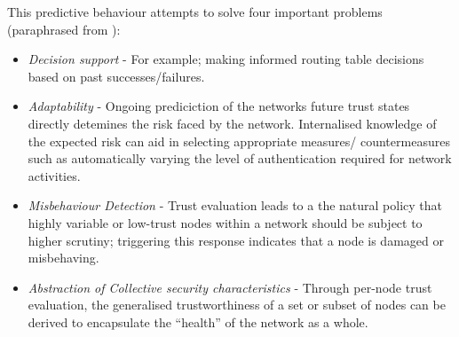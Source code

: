 This predictive behaviour attempts to solve four important problems (paraphrased from \cite{Sun2008}):
\begin{itemize}
  \item \emph{Decision support} - For example; making informed routing table decisions based on past successes/failures.
  \item \emph{Adaptability} - Ongoing prediciction of the networks future trust states directly detemines the risk faced by the network. Internalised knowledge of the expected risk can aid in selecting appropriate measures/ countermeasures such as automatically varying the level of authentication required for network activities.
  \item \emph{Misbehaviour Detection} - Trust evaluation leads to a the natural policy that highly variable or low-trust nodes within a network should be subject to higher scrutiny; triggering this response indicates that a node is damaged or misbehaving.
  \item \emph{Abstraction of Collective security characteristics} - Through per-node trust evaluation, the generalised trustworthiness of a set or subset of nodes can be derived to encapsulate the ``health'' of the network as a whole.
\end{itemize}


